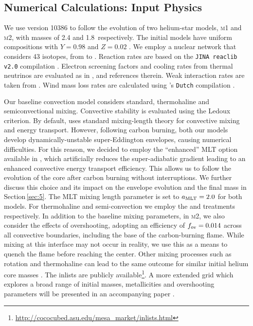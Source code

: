 \documentclass[../../main/thesis_msc.tex]{subfiles}
\begin{document}
\subsection{Numerical Calculations: Input Physics}\label{sec:2.1}
We use \mesa version 10386 to follow the evolution of two helium-star models, \textsc{m1} and \textsc{m2}, with  masses of  2.4 and 1.8\msun\ respectively. 
The initial models have uniform compositions with $Y=0.98$ and $Z=0.02$ \citep[solar abundances are taken from ][]{grevesse1998}. We employ a nuclear network that considers 43  isotopes, from  to . Reaction rates are based on the \texttt{JINA reaclib v2.0} compilation \citep{cyburt2010}. Electron screening factors and cooling rates from thermal neutrinos are evaluated as in \cite{Farmer:2015afs}, and references therein. 
Weak interaction rates are taken from \cite{Suzuki:2015iry}. 
Wind mass loss rates are calculated using \mesa's \texttt{Dutch} compilation   \citep{Paxton:2013pj}. 

Our baseline convection model considers standard, thermohaline and semiconvectional mixing. Convective stability is 
evaluated using the Ledoux criterion. By default, \mesa uses  standard mixing-length theory  \citep[MTL;][]{cox1968} for convective mixing and energy transport. However, following carbon burning, both our models develop 
dynamically-unstable super-Eddington envelopes, causing numerical 
difficulties. For this reason, we decided to employ the ``enhanced'' MLT 
option available in \mesa \citep{Paxton:2013pj}, which artificially reduces 
the super-adiabatic gradient leading to  an enhanced convective energy 
transport efficiency.  This  allows us to follow the evolution of the core 
after carbon burning without interruptions. We further discuss this choice and its impact on the envelope evolution and the final mass in Section\,\ref{sec:5}. 
The MLT mixing length parameter is set to $a_{\rm MLT}=2.0$ for both models. For thermohaline and semi-convection we employ the \cite{Kipp_thermohaline} and \cite{Langer1983} treatments respectively. 
In addition to the baseline mixing parameters, in \textsc{m2}, we also 
consider the effects of overshooting, adopting an efficiency of $f_{\rm ov}=0.014$ across all convective boundaries, including the base of the 
carbon-burning flame. While mixing at this interface may not occur in reality, 
we use this as a means to  quench the flame before reaching the center.  
Other mixing processes such as rotation and thermohaline can lead to the 
same outcome for similar initial helium core masses \citep{Farmer:2015afs}.
The \mesa inlists are publicly available\footnote{\url{http://cococubed.asu.edu/mesa_market/inlists.html}}. 
A more extended grid which explores a broad range of initial masses, 
metallicities and overshooting parameters will be presented in an 
accompanying paper \citep{chanlaridis2019}.       
\end{document}
